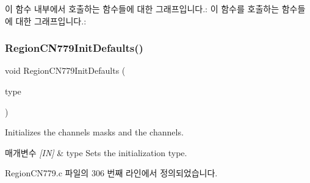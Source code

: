 이 함수 내부에서 호출하는 함수들에 대한 그래프입니다.\+:
이 함수를 호출하는 함수들에 대한 그래프입니다.\+:
\mbox{\label{group___r_e_g_i_o_n_c_n779_ga85953f37b52567b54689c354671a14f6}} 
\subsubsection{\texorpdfstring{Region\+C\+N779\+Init\+Defaults()}{RegionCN779InitDefaults()}}
{\footnotesize\ttfamily void Region\+C\+N779\+Init\+Defaults (\begin{DoxyParamCaption}\item[{\mbox{\hyperlink{group___r_e_g_i_o_n_gaddc73ae10673ec925724e7870363bda9}{Init\+Type\+\_\+t}}}]{type }\end{DoxyParamCaption})}



Initializes the channels masks and the channels. 


\begin{DoxyParams}{매개변수}
{\em \mbox{[}\+I\+N\mbox{]}} & type Sets the initialization type. \\
\hline
\end{DoxyParams}


Region\+C\+N779.\+c 파일의 306 번째 라인에서 정의되었습니다.


